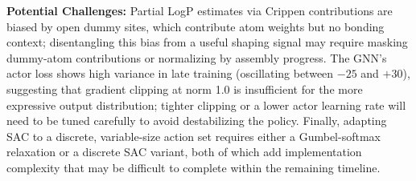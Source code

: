 \documentclass{article}
\begin{document}
\textbf{Potential Challenges:} Partial LogP estimates via Crippen contributions are biased by open dummy sites, which contribute atom weights but no bonding context; disentangling this bias from a useful shaping signal may require masking dummy-atom contributions or normalizing by assembly progress. The GNN's actor loss shows high variance in late training (oscillating between $-25$ and $+30$), suggesting that gradient clipping at norm 1.0 is insufficient for the more expressive output distribution; tighter clipping or a lower actor learning rate will need to be tuned carefully to avoid destabilizing the policy. Finally, adapting SAC to a discrete, variable-size action set requires either a Gumbel-softmax relaxation or a discrete SAC variant, both of which add implementation complexity that may be difficult to complete within the remaining timeline.
\end{document}
